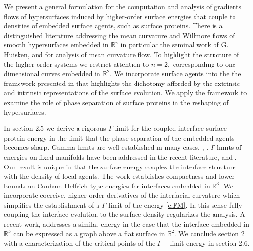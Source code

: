 \documentclass[11pt]{amsart}
\theoremstyle{plain}
\def\mbbR{\mathbb{R}}
\numberwithin{equation}{section}
\theoremstyle{plain}
\begin{document}
 We present a general formulation for the computation and analysis of gradients flows of  hypersurfaces induced by higher-order surface energies that couple to densities of embedded surface agents, such as surface proteins. There is a distinguished literature addressing the mean curvature and Willmore flows of smooth hypersurfaces embedded in $\mbbR^n$ in particular the seminal work of G. Huisken,
  \cite{Hui-84} and \cite{hui-86contr} for analysis of mean curvature flow. To highlight the structure of the higher-order systems we restrict attention to $n=2,$ corresponding to one-dimensional curves embedded in $\mbbR^2.$ We incorporate surface agents into the  the framework presented in \cite{NPW_25} that highlights the dichotomy afforded by the extrinsic and intrinsic representations of the surface evolution. We apply the framework to examine the role of phase separation of surface proteins in the reshaping of hypersurfaces.
  
  In section 2.5 we derive a rigorous $\Gamma$-limit for the coupled interface-surface protein energy in the limit that  the phase separation of the embedded agents becomes sharp.
  Gamma limits are well established in many cases, \cite{Federer_14}, \cite{Morgan_16}. $\Gamma$ limits of energies on fixed manifolds have been addressed in the recent literature, \cite{Uecker_23} and \cite{Uecker_25}. Our result is unique in that the surface energy couples the interface structure with the density of local agents.
   The work \cite{Roger_23} establishes compactness and lower bounds on Canham-Helfrich type energies for interfaces embedded in $\mbbR^3.$
  We incorporate coercive, higher-order derivatives of the interfacial curvature which simplifies the establishment of a $\Gamma$ limit of the energy \eqref{e:FM}. In this sense fully coupling the interface evolution to the surface density regularizes the analysis.  A recent work, \cite{Hayrap_24} addresses a similar energy in the case that the interface embedded in $\mbbR^3$ can be expressed as a graph above a flat surface in $\mbbR^2$. 
  We conclude section 2 with a characterization of the critical points of the $\Gamma-$limit energy in section 2.6.
\end{document}
